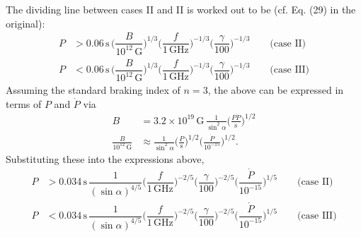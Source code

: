 \documentclass{book}
\begin{document}
The dividing line between cases II and II is worked out to be (cf. Eq. (29) in the original):
\begin{equation}
    \begin{aligned}
        P &> 0.06\,\text{s} \,
            \bigg(\dfrac{B}{10^{12}\,\text{G}}\bigg)^{1/3}
            \bigg(\dfrac{f}{1\,\text{GHz}}\bigg)^{-1/3}
            \bigg(\dfrac{\gamma}{100}\bigg)^{-1/3}
            \qquad\text{(case II)} \\
        P &< 0.06\,\text{s} \,
            \bigg(\dfrac{B}{10^{12}\,\text{G}}\bigg)^{1/3}
            \bigg(\dfrac{f}{1\,\text{GHz}}\bigg)^{-1/3}
            \bigg(\dfrac{\gamma}{100}\bigg)^{-1/3}
            \qquad\text{(case III)}
    \end{aligned}
\end{equation}
Assuming the standard braking index of $n=3$, the above can be expressed in terms of $P$ and $\dot{P}$ via
\begin{equation}
    \begin{aligned}
        B &= 3.2\times10^{19}\,\text{G} \, \frac{1}{\sin^2\alpha} \bigg(\frac{P\dot{P}}{\text{s}}\bigg)^{1/2} \\
        \frac{B}{10^{12}\,\text{G}} &\approx \frac{1}{\sin^2\alpha} \bigg(\frac{P}{\text{s}}\bigg)^{1/2}\bigg(\frac{\dot{P}}{10^{-15}}\bigg)^{1/2}.
    \end{aligned}
\end{equation}
Substituting these into the expressions above,
\begin{equation}
    \begin{aligned}
        P &> 0.034\,\text{s} \,
            \dfrac{1}{(\sin\alpha)^{4/5}}
            \bigg(\dfrac{f}{1\,\text{GHz}}\bigg)^{-2/5}
            \bigg(\dfrac{\gamma}{100}\bigg)^{-2/5}
            \bigg(\dfrac{\dot{P}}{10^{-15}}\bigg)^{1/5}
            \qquad\text{(case II)} \\
        P &< 0.034\,\text{s} \,
            \dfrac{1}{(\sin\alpha)^{4/5}}
            \bigg(\dfrac{f}{1\,\text{GHz}}\bigg)^{-2/5}
            \bigg(\dfrac{\gamma}{100}\bigg)^{-2/5}
            \bigg(\dfrac{\dot{P}}{10^{-15}}\bigg)^{1/5}
            \qquad\text{(case III)}
    \end{aligned}
\end{equation}
\end{document}

